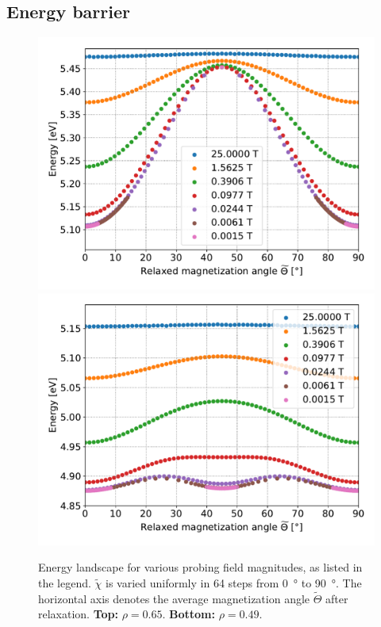 \documentclass[twocolumn]{phdsymp}
\begin{document}
\subsection{Energy barrier}
\begin{figure}
    \centering
    \includegraphics[width=0.9\columnwidth]{Figures/Plus_65_B25-0.001-div4_a128Pi_plotOptimized.pdf}
    \includegraphics[width=0.9\columnwidth]{Figures/Plus_48.2_B25-0.001-div4_a128Pi_plotOptimized.pdf}
    \caption{Energy landscape for various probing field magnitudes, as listed in the legend. $\widetilde{\chi}$ is varied uniformly in 64 steps from \SI{0}{\degree} to \SI{90}{\degree}. The horizontal axis denotes the average magnetization angle $\widetilde{\Theta}$ after relaxation. \textbf{Top:} $\rho=0.65$. \textbf{Bottom:} $\rho=0.49$.}
    \label{fig:EA_EnergyLandscape}
\end{figure}
\end{document}

